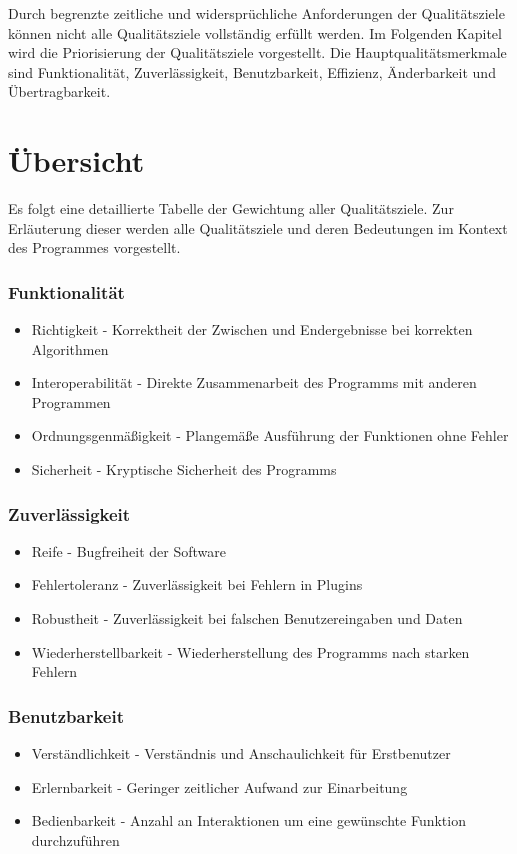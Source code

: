 Durch begrenzte zeitliche und widersprüchliche Anforderungen der Qualitätsziele können nicht alle Qualitätsziele vollständig erfüllt werden.
Im Folgenden Kapitel wird die Priorisierung der Qualitätsziele vorgestellt.
Die Hauptqualitätsmerkmale sind Funktionalität, Zuverlässigkeit, Benutzbarkeit, Effizienz, Änderbarkeit und Übertragbarkeit.
\section{Übersicht}
Es folgt eine detaillierte Tabelle der Gewichtung aller Qualitätsziele.
Zur Erläuterung dieser werden alle Qualitätsziele und deren Bedeutungen im Kontext des Programmes vorgestellt.
\begin{normalsize}

\end{normalsize}
\subsubsection{Funktionalität}
\begin{itemize}
\item Richtigkeit - Korrektheit der Zwischen und Endergebnisse bei korrekten Algorithmen
\item Interoperabilität - Direkte Zusammenarbeit des Programms mit anderen Programmen
\item Ordnungsgenmäßigkeit - Plangemäße Ausführung der Funktionen ohne Fehler 
\item Sicherheit - Kryptische Sicherheit des Programms 
\end{itemize}
\subsubsection{Zuverlässigkeit}
\begin{itemize}
\item Reife - Bugfreiheit der Software
\item Fehlertoleranz - Zuverlässigkeit bei Fehlern in Plugins
\item Robustheit - Zuverlässigkeit bei falschen Benutzereingaben und Daten
\item Wiederherstellbarkeit - Wiederherstellung des Programms nach starken Fehlern
\end{itemize}
\subsubsection{Benutzbarkeit}
\begin{itemize}
\item Verständlichkeit - Verständnis und Anschaulichkeit für Erstbenutzer
\item Erlernbarkeit - Geringer zeitlicher Aufwand zur Einarbeitung
\item Bedienbarkeit - Anzahl an Interaktionen um eine gewünschte Funktion durchzuführen
\end{itemize}
\newpage
